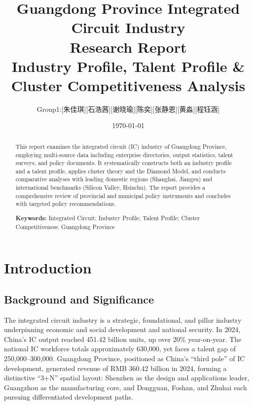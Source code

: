 \documentclass[12pt,a4paper]{article}
\title{{\Huge \textbf{Guangdong Province Integrated Circuit Industry}}\\[4pt]
       {\Large \textbf{Research Report}}\\[8pt]
       {\large Industry Profile, Talent Profile \& Cluster Competitiveness Analysis}}
\author{Group1:[朱佳琪][石浩茜][谢晓瑜][陈奕][张静恩][黄淼][程钰涵]}
\date{\today}
\begin{document}
\maketitle
\thispagestyle{empty}

\begin{abstract}
\noindent
This report examines the integrated circuit (IC) industry of Guangdong Province,
employing multi-source data including enterprise directories, output statistics,
talent surveys, and policy documents. It systematically constructs both an
industry profile and a talent profile, applies cluster theory and the Diamond
Model, and conducts comparative analyses with leading domestic regions
(Shanghai, Jiangsu) and international benchmarks (Silicon Valley, Hsinchu).
The report provides a comprehensive review of provincial and municipal policy
instruments and concludes with targeted policy recommendations.

\textbf{Keywords:} Integrated Circuit; Industry Profile; Talent Profile;
Cluster Competitiveness; Guangdong Province
\end{abstract}

\newpage
\tableofcontents
\newpage
\listoffigures
\listoftables
\newpage

\section{Introduction}
\label{sec:intro}

\subsection{Background and Significance}
\label{sec:background}

The integrated circuit industry is a strategic, foundational, and
pillar industry underpinning economic and social development and national
security. In 2024, China's IC output reached 451.42 billion units,
up over 20\% year-on-year. The national IC workforce totals approximately
630,000, yet faces a talent gap of 250,000--300,000.
Guangdong Province, positioned as China's ``third pole'' of IC development,
generated revenue of RMB 360.42 billion in 2024, forming a distinctive
``3+N'' spatial layout: Shenzhen as the design and applications leader,
Guangzhou as the manufacturing core, and Dongguan, Foshan, and Zhuhai
each pursuing differentiated development paths.
\end{document}

